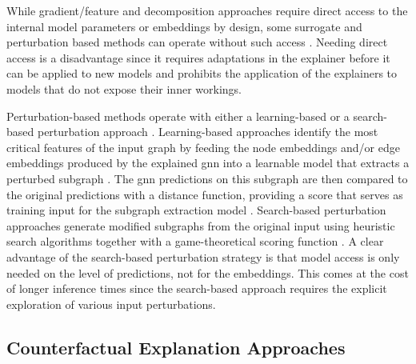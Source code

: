 While gradient/feature and decomposition approaches require direct access to the internal model parameters or embeddings by design, some surrogate and perturbation based methods can operate without such access \cite{kakkad_survey_2023}. Needing direct access is a disadvantage since it requires adaptations in the explainer before it can be applied to new models and prohibits the application of the explainers to models that do not expose their inner workings.

Perturbation-based methods operate with either a learning-based or a search-based perturbation approach \cite{xia_explaining_2023}. Learning-based approaches identify the most critical features of the input graph by feeding the node embeddings and/or edge embeddings produced by the explained \gls{gnn} into a learnable model that extracts a perturbed subgraph \cite{kakkad_survey_2023, xia_explaining_2023}. The \gls{gnn} predictions on this subgraph are then compared to the original predictions with a distance function, providing a score that serves as training input for the subgraph extraction model \cite{kakkad_survey_2023}. Search-based perturbation approaches generate modified subgraphs from the original input using heuristic search algorithms together with a game-theoretical scoring function \cite{xia_explaining_2023, yuan_explainability_2021}. A clear advantage of the search-based perturbation strategy is that model access is only needed on the level of predictions, not for the embeddings. This comes at the cost of longer inference times \cite{xia_explaining_2023} since the search-based approach requires the explicit exploration of various input perturbations.



\subsection{Counterfactual Explanation Approaches}
\label{s_ExplainingGNNs_CounterFactual}

